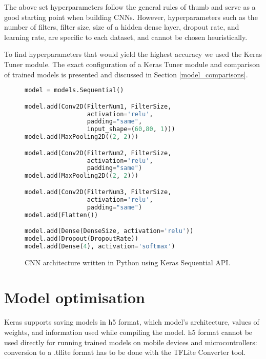 The above set hyperparameters follow the general rules of thumb and serve as a good starting point when building CNNs\cite{cs231n}.
However, hyperparameters such as the number of filters, filter size, size of a hidden dense layer, dropout rate, and learning rate, are specific to each dataset, and cannot be chosen heuristically.

To find hyperparameters that would yield the highest accuracy we used the Keras Tuner module.
The exact configuration of a Keras Tuner module and comparison of trained models is presented and discussed in Section \ref{model_comparisons}.

\lstset{style=mystyle}
\begin{figure}[ht] 
    \begin{lstlisting}[language=Python]
model = models.Sequential()

model.add(Conv2D(FilterNum1, FilterSize, 
                 activation='relu', 
                 padding="same", 
                 input_shape=(60,80, 1)))
model.add(MaxPooling2D((2, 2)))

model.add(Conv2D(FilterNum2, FilterSize, 
                 activation='relu', 
                 padding="same")
model.add(MaxPooling2D((2, 2)))

model.add(Conv2D(FilterNum3, FilterSize, 
                 activation='relu', 
                 padding="same")
model.add(Flatten())

model.add(Dense(DenseSize, activation='relu'))
model.add(Dropout(DropoutRate))
model.add(Dense(4), activation='softmax')
\end{lstlisting}
    \caption{ CNN architecture written in Python using Keras Sequential API.}
    \label{model_code}
\end{figure}


\section{ Model optimisation}

Keras supports saving models in h5 format, which model's architecture, values of weights, and information used while compiling the model.
h5 format cannot be used directly for running trained models on mobile devices and microcontrollers: conversion to a .tflite format has to be done with the TFLite Converter tool.

